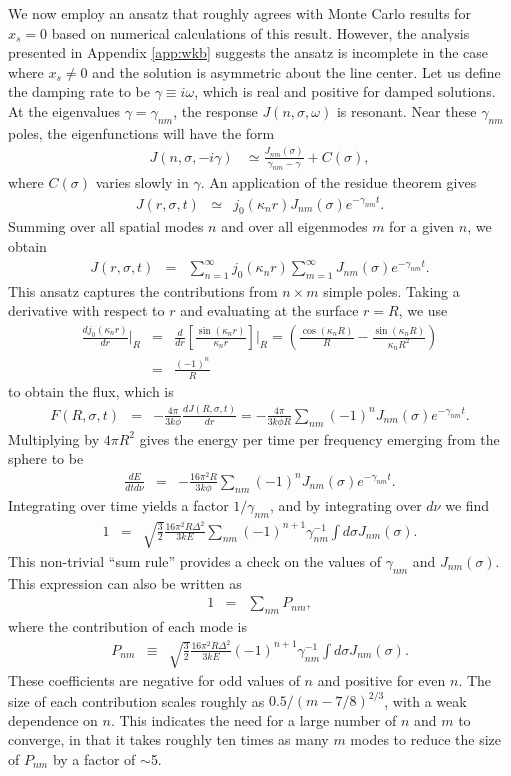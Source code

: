 \documentclass{aastex63}
\newcommand{\be}{\begin{eqnarray}}
\newcommand{\ee}{\end{eqnarray}}
\begin{document}
We now employ an ansatz that roughly agrees with Monte Carlo results for $x_s=0$ based on numerical calculations of this result. However, the analysis presented in Appendix \ref{app:wkb} suggests the ansatz is incomplete in the case where $x_s \neq 0$ and the solution is asymmetric about the line center. Let us define the damping rate to be $\gamma \equiv i\omega$, which is real and positive for damped solutions. At the eigenvalues $\gamma=\gamma_{nm}$, the response $J(n, \sigma, \omega)$ is resonant. Near these $\gamma_{nm}$ poles, the eigenfunctions will have the form 
\be \label{eq:jnsigmaomega_approx}
J(n,\sigma,-i\gamma) & \simeq \frac{ J_{nm}(\sigma) }{\gamma_{nm} - \gamma} + C(\sigma),
\ee
where $C(\sigma)$ varies slowly in $\gamma$. An application of the residue theorem gives
\be
J(r,\sigma,t) & \simeq & j_0(\kappa_n r) J_{nm}(\sigma) e^{-\gamma_{nm}t}.
\ee
Summing over all spatial modes $n$ and over all eigenmodes $m$ for a given $n$, we obtain
\be \label{eq:Jrsigmat}
J(r,\sigma,t) & = & \sum_{n=1}^\infty j_0(\kappa_n r)  \sum_{m=1}^{\infty} J_{nm}(\sigma) e^{-\gamma_{nm}t}.
\ee
This ansatz captures the contributions from $n \times m$ simple poles. Taking a derivative with respect to $r$ and evaluating at the surface $r=R$, we use
\be
\frac{dj_0(\kappa_n r)}{dr} \bigg\rvert_R & =& \frac{d}{dr} \left[ \frac{\sin(\kappa_n r)}{\kappa_n r} \right]\bigg\rvert_R
=  \left( \frac{\cos(\kappa_n R)}{R} - \frac{\sin(\kappa_n R)}{\kappa_n R^2} \right)
\nonumber \\ & = & \frac{(-1)^n}{R}
\ee
to obtain the flux, which is
\be
F(R,\sigma,t) & =& - \frac{4\pi}{3k\phi} \frac{dJ(R,\sigma,t)}{dr} 
= - \frac{4\pi}{3k\phi R}  \sum_{nm} (-1)^n J_{nm}(\sigma) e^{-\gamma_{nm}t}.
\ee
Multiplying by $4\pi R^2$ gives the energy per time per frequency emerging from the sphere to be
\be
\frac{dE}{dtd\nu} & = & - \frac{16\pi^2 R}{3k\phi}  \sum_{nm} (-1)^n J_{nm}(\sigma) e^{-\gamma_{nm}t}.
\label{eq:dEdtdnu}
\ee
Integrating over time yields a factor $1/\gamma_{nm}$, and by integrating over $d\nu$ we find
\be \label{eq:sum_rule}
1 & = &  \sqrt{ \frac{3}{2} } \frac{16\pi^2R\Delta^2}{3kE} \sum_{nm} (-1)^{n+1} \gamma_{nm}^{-1} \int d\sigma J_{nm}(\sigma).
\ee
This non-trivial ``sum rule'' provides a check on the values of $\gamma_{nm}$ and $J_{nm}(\sigma)$. This expression can also be written as
\be
1 & =& \sum_{nm} P_{nm},
\label{eq:sumrule}
\ee
where the contribution of each mode is
\be \label{eq:pnmsoln}
P_{nm} & \equiv & \sqrt{ \frac{3}{2} } \frac{16\pi^2R\Delta^2}{3kE}  (-1)^{n+1} \gamma_{nm}^{-1} \int d\sigma J_{nm}(\sigma).
\ee
These coefficients are negative for odd values of $n$ and positive for even $n$. The size of each contribution scales roughly as $0.5/(m-7/8)^{2/3}$, with a weak dependence on $n$. This indicates the need for a large number of $n$ and $m$ to converge, in that it takes roughly ten times as many $m$ modes to reduce the size of $P_{nm}$ by a factor of ${\sim}$5. 
\end{document}
